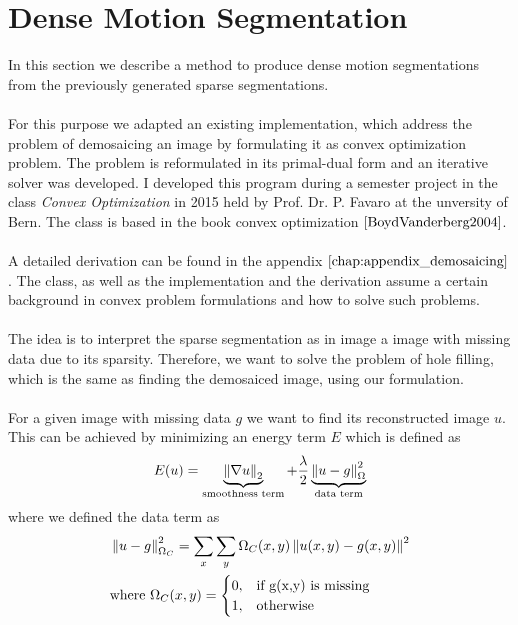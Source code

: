 
\section{Dense Motion Segmentation}
\label{sec:dense_motion_segmentation}
In this section we describe a method to produce dense motion segmentations from the previously generated sparse segmentations. \\ \\
For this purpose we adapted an existing implementation, which address the problem of demosaicing an image by formulating it as convex optimization problem. The problem is reformulated in its primal-dual form and an iterative solver was developed. I developed this program during a semester project in the class \textit{Convex Optimization} in 2015 held by Prof. Dr. P. Favaro at the unversity of Bern. The class is based in the book convex optimization $\cite{BoydVanderberg2004}$. \\ \\
A detailed derivation can be found in the appendix $\ref{chap:appendix_demosaicing}$. The class, as well as the implementation and the derivation assume a certain background in convex problem formulations and how to solve such problems. \\ \\
The idea is to interpret the sparse segmentation as in image a image with missing data due to its sparsity. Therefore, we want to solve the problem of hole filling, which is the same as finding the demosaiced image, using our formulation. \\ \\
For a given image with missing data $g$ we want to find its reconstructed image $u$. This can be achieved by minimizing an energy term $E$ which is defined as 
\begin{equation}
	E(u) = \underbrace{\left\lVert\nabla u\right\rVert_2}_{\text{smoothness term}} + \frac{\lambda}{2} \underbrace{\left\lVert u - g\right\rVert^2_{\Omega}}_{\text{data term}}	
\end{equation}
where we defined the data term as
\begin{equation}
\begin{aligned}
& \norm{u - g}^2_{\Omega_{C}} = \sum_x \sum_y \Omega_{C}(x,y)\norm{u(x,y) - g(x,y)}^2 \\
& \text{where } \Omega_{C}(x,y)= 
\begin{cases}
    0,& \text{if } $g(x,y)$ \text{ is missing}\\
    1,              & \text{otherwise}
\end{cases}
\end{aligned}
\end{equation}
